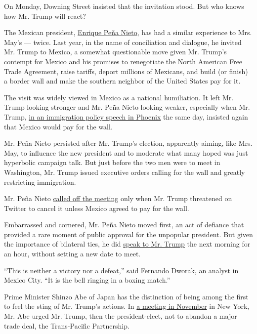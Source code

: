 On Monday, Downing Street insisted that the invitation stood. But who
knows how Mr. Trump will react?

The Mexican president,
\href{https://www.nytimes.com/2017/01/27/world/americas/trump-mexican-president-phone-call.html}{Enrique
Peña Nieto}, has had a similar experience to Mrs. May's --- twice. Last
year, in the name of conciliation and dialogue, he invited Mr. Trump to
Mexico, a somewhat questionable move given Mr. Trump's contempt for
Mexico and his promises to renegotiate the North American Free Trade
Agreement, raise tariffs, deport millions of Mexicans, and build (or
finish) a border wall and make the southern neighbor of the United
States pay for it.

The visit was widely viewed in Mexico as a national humiliation. It left
Mr. Trump looking stronger and Mr. Peña Nieto looking weaker, especially
when Mr. Trump,
\href{https://www.nytimes.com/2016/09/01/us/politics/donald-trump-immigration-speech.html}{in
an immigration policy speech in Phoenix} the same day, insisted again
that Mexico would pay for the wall.

Mr. Peña Nieto persisted after Mr. Trump's election, apparently aiming,
like Mrs. May, to influence the new president and to moderate what many
hoped was just hyperbolic campaign talk. But just before the two men
were to meet in Washington, Mr. Trump issued executive orders calling
for the wall and greatly restricting immigration.

Mr. Peña Nieto
\href{https://www.nytimes.com/2017/01/26/world/mexicos-president-cancels-meeting-with-trump-over-wall.html?_r=0}{called
off the meeting} only when Mr. Trump threatened on Twitter to cancel it
unless Mexico agreed to pay for the wall.

Embarrassed and cornered, Mr. Peña Nieto moved first, an act of defiance
that provided a rare moment of public approval for the unpopular
president. But given the importance of bilateral ties, he did
\href{https://www.nytimes.com/2017/01/27/world/americas/trump-mexican-president-phone-call.html}{speak
to Mr. Trump} the next morning for an hour, without setting a new date
to meet.

``This is neither a victory nor a defeat,'' said Fernando Dworak, an
analyst in Mexico City. ``It is the bell ringing in a boxing match.''

Prime Minister Shinzo Abe of Japan has the distinction of being among
the first to feel the sting of Mr. Trump's actions. In
\href{https://www.nytimes.com/2016/11/17/world/asia/shinzo-abe-donald-trump.html}{a
meeting in November} in New York, Mr. Abe urged Mr. Trump, then the
president-elect, not to abandon a major trade deal, the Trans-Pacific
Partnership.

